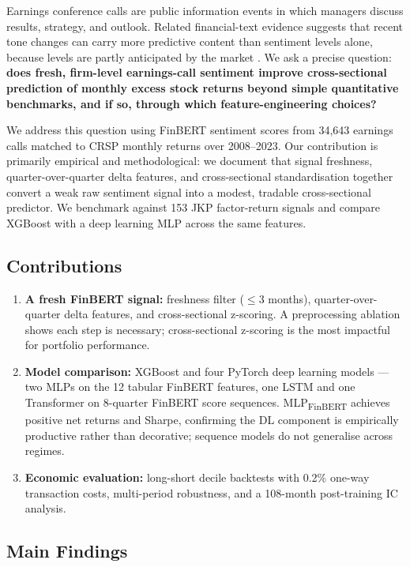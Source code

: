 Earnings conference calls are public information events in which managers discuss results, strategy, and outlook. Related financial-text evidence suggests that recent tone changes can carry more predictive content than sentiment levels alone, because levels are partly anticipated by the market \cite{huang2023}. We ask a precise question: \textbf{does fresh, firm-level earnings-call sentiment improve cross-sectional prediction of monthly excess stock returns beyond simple quantitative benchmarks, and if so, through which feature-engineering choices?}

We address this question using FinBERT \cite{araci2019} sentiment scores from 34,643 earnings calls matched to CRSP monthly returns over 2008--2023. Our contribution is primarily empirical and methodological: we document that signal freshness, quarter-over-quarter delta features, and cross-sectional standardisation together convert a weak raw sentiment signal into a modest, tradable cross-sectional predictor. We benchmark against 153 JKP factor-return signals \cite{jkp2023} and compare XGBoost with a deep learning MLP across the same features.

\subsection*{Contributions}

\begin{enumerate}[noitemsep]
    \item \textbf{A fresh FinBERT signal:} freshness filter ($\leq 3$ months), quarter-over-quarter delta features, and cross-sectional z-scoring. A preprocessing ablation shows each step is necessary; cross-sectional z-scoring is the most impactful for portfolio performance.
    \item \textbf{Model comparison:} XGBoost and four PyTorch deep learning models --- two MLPs on the 12 tabular FinBERT features, one LSTM and one Transformer on 8-quarter FinBERT score sequences. MLP\textsubscript{FinBERT} achieves positive net returns and Sharpe, confirming the DL component is empirically productive rather than decorative; sequence models do not generalise across regimes.
    \item \textbf{Economic evaluation:} long-short decile backtests with 0.2\% one-way transaction costs, multi-period robustness, and a 108-month post-training IC analysis.
\end{enumerate}

\subsection*{Main Findings}

